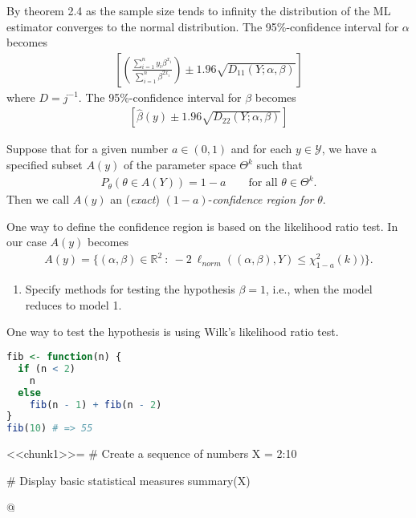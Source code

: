 By theorem 2.4 as the sample size tends to infinity the distribution of the ML estimator converges to the normal distribution.
The 95\%-confidence interval for $\alpha$ becomes
\begin{align*}
    \left[ \left( \frac{\sum_{i=1}^n y_i \beta^{x_i}}{\sum_{i=1}^n \beta^{2x_i}}\right) \pm 1.96 \sqrt{D_{11}(Y; \alpha, \beta)} \right]
\end{align*}
where $D = j^{-1}$.
The 95\%-confidence interval for $\beta$ becomes
\begin{align*}
    \left[ \hat{\beta}(y) \pm 1.96 \sqrt{D_{22}(Y; \alpha, \beta)} \right]
\end{align*}
\begin{definition}
Suppose that for a given number $a \in (0,1)$ and for each $y \in \mathcal{Y}$, we have a specified subset $A(y)$ of the parameter space $\Theta^k$ such that
\begin{align*}
    P_\theta(\theta \in A(Y)) = 1 - a \qquad \text{for all } \theta \in \Theta^k.
\end{align*}
Then we call $A(y)$ an (\textit{exact}) $(1 - a)$-\textit{confidence region for} $\theta$.
\end{definition}
One way to define the confidence region is based on the likelihood ratio test.
In our case $A(y)$ becomes
\begin{align*}
    A(y) = \{ (\alpha, \beta) \in \mathbb{R}^2 \ : \ -2 \: \ell_{norm}((\alpha, \beta), Y) \leq \chi^2_{1 - a}(k))\}.
\end{align*}

\begin{enumerate}[resume]
    \item Specify methods for testing the hypothesis $\beta = 1$, i.e., when the model reduces to model 1.
\end{enumerate}
One way to test the hypothesis is using Wilk's likelihood ratio test.

\begin{lstlisting}[language=R]
fib <- function(n) {
  if (n < 2)
    n
  else
    fib(n - 1) + fib(n - 2)
}
fib(10) # => 55
\end{lstlisting}

<<chunk1>>=
# Create a sequence of numbers
X = 2:10
 
# Display basic statistical measures
summary(X)
 
@